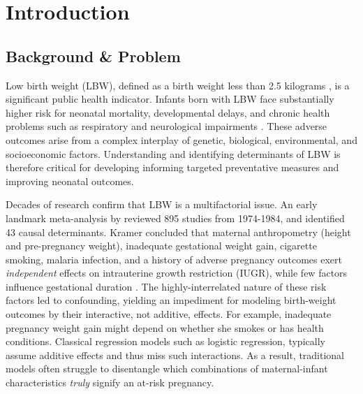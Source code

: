 \newpage 
\chapter{Introduction}
\label{chap:introduction}

\section{Background \& Problem}

Low birth weight (LBW), defined as a birth weight less than 2.5 kilograms \parencite{lbw_def, kramer1987}, is a significant public health indicator. Infants born with LBW face substantially higher risk for neonatal mortality, developmental delays, and chronic health problems such as respiratory and neurological impairments \parencite{finch2003}. These adverse outcomes arise from a complex interplay of genetic, biological, environmental, and socioeconomic factors. Understanding and identifying determinants of LBW is therefore critical for developing informing targeted preventative measures and improving neonatal outcomes. 

Decades of research confirm that LBW is a multifactorial issue. An early landmark meta-analysis by \textcite{kramer1987} reviewed 895 studies from 1974-1984, and identified 43 causal determinants. Kramer concluded that maternal anthropometry (height and pre-pregnancy weight), inadequate gestational weight gain, cigarette smoking, malaria infection, and a history of adverse pregnancy outcomes exert \emph{independent} effects on intrauterine growth restriction (IUGR), while few factors influence gestational duration \parencite{kramer1987}. The highly-interrelated nature of these risk factors led to confounding, yielding an impediment for modeling birth-weight outcomes by their interactive, not additive, effects. For example, inadequate pregnancy weight gain might depend on whether she smokes or has health conditions. Classical regression models such as logistic regression, typically assume additive effects and thus miss such interactions. As a result, traditional models often struggle to disentangle which combinations of maternal-infant characteristics \emph{truly} signify an at-risk pregnancy.

